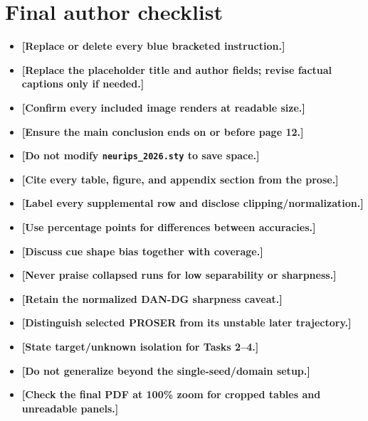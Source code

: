 \documentclass{article}
\begin{document}
\section{Final author checklist}
\begin{itemize}
  \item \textbf{[Replace or delete every blue bracketed instruction.]}
  \item \textbf{[Replace the placeholder title and author fields; revise factual captions only if needed.]}
  \item \textbf{[Confirm every included image renders at readable size.]}
  \item \textbf{[Ensure the main conclusion ends on or before page 12.]}
  \item \textbf{[Do not modify \texttt{neurips\_2026.sty} to save space.]}
  \item \textbf{[Cite every table, figure, and appendix section from the prose.]}
  \item \textbf{[Label every supplemental row and disclose clipping/normalization.]}
  \item \textbf{[Use percentage points for differences between accuracies.]}
  \item \textbf{[Discuss cue shape bias together with coverage.]}
  \item \textbf{[Never praise collapsed runs for low separability or sharpness.]}
  \item \textbf{[Retain the normalized DAN-DG sharpness caveat.]}
  \item \textbf{[Distinguish selected PROSER from its unstable later trajectory.]}
  \item \textbf{[State target/unknown isolation for Tasks 2--4.]}
  \item \textbf{[Do not generalize beyond the single-seed/domain setup.]}
  \item \textbf{[Check the final PDF at 100\% zoom for cropped tables and unreadable panels.]}
\end{itemize}
\end{document}
